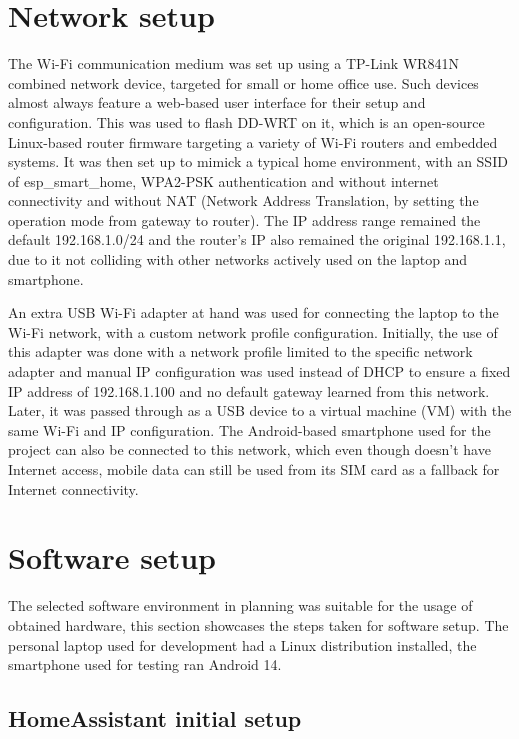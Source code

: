 \section{Network setup}

The Wi-Fi communication medium was set up using a TP-Link WR841N combined network device, targeted for small or home office use. Such devices almost always feature a web-based user interface for their setup and configuration. This was used to flash DD-WRT on it, which is an open-source Linux-based router firmware targeting a variety of Wi-Fi routers and embedded systems. \cite{DDWRTHomepage} It was then set up to mimick a typical home environment, with an SSID of esp\_smart\_home, WPA2-PSK authentication and without internet connectivity and without NAT (Network Address Translation, by setting the operation mode from gateway to router). The IP address range remained the default 192.168.1.0/24 and the router's IP also remained the original 192.168.1.1, due to it not colliding with other networks actively used on the laptop and smartphone.

An extra USB Wi-Fi adapter at hand was used for connecting the laptop to the Wi-Fi network, with a custom network profile configuration. Initially, the use of this adapter was done with a network profile limited to the specific network adapter and manual IP configuration was used instead of DHCP to ensure a fixed IP address of 192.168.1.100 and no default gateway learned from this network. Later, it was passed through as a USB device to a virtual machine (VM) with the same Wi-Fi and IP configuration. The Android-based smartphone used for the project can also be connected to this network, which even though doesn't have Internet access, mobile data can still be used from its SIM card as a fallback for Internet connectivity.

\section{Software setup}

The selected software environment in planning was suitable for the usage of obtained hardware, this section showcases the steps taken for software setup. The personal laptop used for development had a Linux distribution installed, the smartphone used for testing ran Android 14. 

\subsection{HomeAssistant initial setup}

